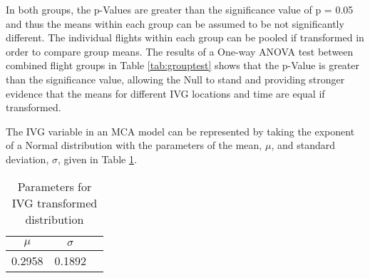 \documentclass[preprint,12pt,a4paper,authoryear]{elsarticle}
\begin{document}
\begin{linenumbers}
In both groups, the p-Values are greater than the significance value of p = 0.05 and thus the means within each group can be assumed to be not significantly different. The individual flights within each group can be pooled if transformed in order to compare group means. The results of a One-way ANOVA test between combined flight groups in Table \ref{tab:grouptest} shows that the p-Value is greater than the significance value, allowing the Null to stand and providing stronger evidence that the means for different IVG locations and time are equal if transformed.
%
\begin{table}[H]
\centering
\caption{Statistics and One-way ANOVA test for transformed groups.}
\label{tab:grouptest}
\end{table}

The IVG variable in an MCA model can be represented by taking the exponent of a Normal distribution with the parameters of the mean, $\mu$, and standard deviation, $\sigma$, given in Table \ref{tab:gapnormal}.

\begin{table}[H]
\centering
\caption{Parameters for IVG transformed distribution}
\label{tab:gapnormal}
\begin{tabular}{@{}ccc@{}}
\toprule
 \textbf{$\mu$} & \textbf{$\sigma$} \\ \midrule
 0.2958 & 0.1892 \\ \bottomrule
\end{tabular}
\end{table}


\end{linenumbers}
\end{document}
